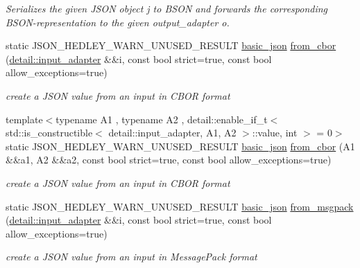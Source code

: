 \begin{DoxyCompactItemize}
\begin{DoxyCompactList}\small\item\em Serializes the given J\+S\+ON object {\ttfamily j} to B\+S\+ON and forwards the corresponding B\+S\+O\+N-\/representation to the given output\+\_\+adapter {\ttfamily o}. \end{DoxyCompactList}\item 
static J\+S\+O\+N\+\_\+\+H\+E\+D\+L\+E\+Y\+\_\+\+W\+A\+R\+N\+\_\+\+U\+N\+U\+S\+E\+D\+\_\+\+R\+E\+S\+U\+LT \hyperlink{classnlohmann_1_1basic__json}{basic\+\_\+json} \hyperlink{classnlohmann_1_1basic__json_a1d568ba1bd6978d80db42aa76626e2cf}{from\+\_\+cbor} (\hyperlink{classnlohmann_1_1detail_1_1input__adapter}{detail\+::input\+\_\+adapter} \&\&i, const bool strict=true, const bool allow\+\_\+exceptions=true)
\begin{DoxyCompactList}\small\item\em create a J\+S\+ON value from an input in C\+B\+OR format \end{DoxyCompactList}\item 
{\footnotesize template$<$typename A1 , typename A2 , detail\+::enable\+\_\+if\+\_\+t$<$ std\+::is\+\_\+constructible$<$ detail\+::input\+\_\+adapter, A1, A2 $>$\+::value, int $>$  = 0$>$ }\\static J\+S\+O\+N\+\_\+\+H\+E\+D\+L\+E\+Y\+\_\+\+W\+A\+R\+N\+\_\+\+U\+N\+U\+S\+E\+D\+\_\+\+R\+E\+S\+U\+LT \hyperlink{classnlohmann_1_1basic__json}{basic\+\_\+json} \hyperlink{classnlohmann_1_1basic__json_a513d6fb63a0ea53ce6c28c05ce0f26e6}{from\+\_\+cbor} (A1 \&\&a1, A2 \&\&a2, const bool strict=true, const bool allow\+\_\+exceptions=true)
\begin{DoxyCompactList}\small\item\em create a J\+S\+ON value from an input in C\+B\+OR format \end{DoxyCompactList}\item 
static J\+S\+O\+N\+\_\+\+H\+E\+D\+L\+E\+Y\+\_\+\+W\+A\+R\+N\+\_\+\+U\+N\+U\+S\+E\+D\+\_\+\+R\+E\+S\+U\+LT \hyperlink{classnlohmann_1_1basic__json}{basic\+\_\+json} \hyperlink{classnlohmann_1_1basic__json_a11458b7982adba51bc634f2f8c961e9b}{from\+\_\+msgpack} (\hyperlink{classnlohmann_1_1detail_1_1input__adapter}{detail\+::input\+\_\+adapter} \&\&i, const bool strict=true, const bool allow\+\_\+exceptions=true)
\begin{DoxyCompactList}\small\item\em create a J\+S\+ON value from an input in Message\+Pack format \end{DoxyCompactList}\item 

\end{DoxyCompactItemize}
